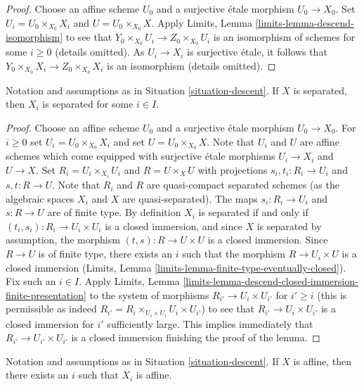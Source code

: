 \begin{proof}
Choose an affine scheme $U_0$ and a surjective \'etale morphism $U_0 \to X_0$.
Set $U_i = U_0 \times_{X_0} X_i$ and $U = U_0 \times_{X_0} X$.
Apply Limits, Lemma \ref{limits-lemma-descend-isomorphism}
to see that $Y_0 \times_{X_0} U_i \to Z_0 \times_{X_0} U_i$
is an isomorphism of schemes for some $i \geq 0$ (details omitted).
As $U_i \to X_i$ is surjective \'etale, it follows that
$Y_0 \times_{X_0} X_i \to Z_0 \times_{X_0} X_i$ is an isomorphism
(details omitted).
\end{proof}

\begin{lemma}
\label{lemma-descend-separated}
Notation and assumptions as in Situation \ref{situation-descent}.
If $X$ is separated, then $X_i$ is separated for some $i \in I$.
\end{lemma}

\begin{proof}
Choose an affine scheme $U_0$ and a surjective \'etale morphism $U_0 \to X_0$.
For $i \geq 0$ set $U_i = U_0 \times_{X_0} X_i$ and set
$U = U_0 \times_{X_0} X$. Note that $U_i$ and $U$ are affine schemes
which come equipped with surjective \'etale morphisms $U_i \to X_i$
and $U \to X$. Set $R_i = U_i \times_{X_i} U_i$ and $R = U \times_X U$
with projections $s_i, t_i : R_i \to U_i$ and $s, t : R \to U$.
Note that $R_i$ and $R$ are quasi-compact separated schemes (as the
algebraic spaces $X_i$ and $X$ are quasi-separated). The maps
$s_i : R_i \to U_i$ and $s : R \to U$ are of finite type.
By definition $X_i$ is separated if and only if
$(t_i, s_i) : R_i \to U_i \times U_i$
is a closed immersion, and since $X$ is separated by assumption,
the morphism $(t, s) : R \to U \times U$ is a closed immersion. Since
$R \to U$ is of finite type, there exists an
$i$ such that the morphism $R \to U_i \times U$ is a closed immersion
(Limits, Lemma \ref{limits-lemma-finite-type-eventually-closed}).
Fix such an $i \in I$. Apply Limits, Lemma
\ref{limits-lemma-descend-closed-immersion-finite-presentation}
to the system of morphisms $R_{i'} \to U_i \times U_{i'}$ for $i' \geq i$
(this is permissible as indeed
$R_{i'} = R_i \times_{U_i \times U_i} U_i \times U_{i'}$)
to see that $R_{i'} \to U_i \times U_{i'}$ is a closed immersion
for $i'$ sufficiently large. This implies immediately
that $R_{i'} \to U_{i'} \times U_{i'}$ is a closed immersion
finishing the proof of the lemma.
\end{proof}

\begin{lemma}
\label{lemma-limit-is-affine}
Notation and assumptions as in Situation \ref{situation-descent}.
If $X$ is affine, then there exists an $i$ such that $X_i$ is affine.
\end{lemma}

